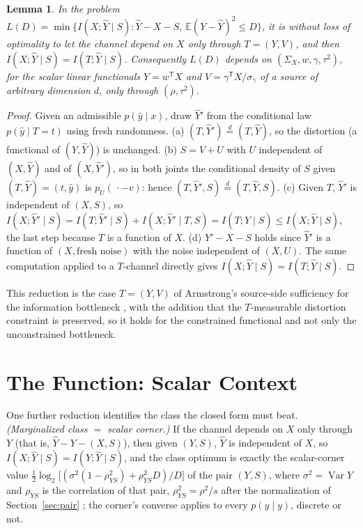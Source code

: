 \documentclass[11pt,onecolumn]{IEEEtran}
\newtheorem{lemma}[theorem]{Lemma}
\newcommand{\E}{\mathbb{E}}
\newcommand{\hY}{\widehat{Y}}
\begin{document}
\begin{lemma}\label{thm:pair}
In the problem
$L(D)=\min\{I(X;\hY\mid S):\hY-X-S,\ \E(Y-\hY)^2\le D\}$, it is without
loss of optimality to let the channel depend on $X$ only through
$T=(Y,V)$, and then $I(X;\hY\mid S)=I(T;\hY\mid S)$. Consequently $L(D)$
depends on $(\Sigma_X,w,\gamma,\tau^2)$, for the scalar linear functionals
$Y=w^{\mathsf T}X$ and $V=\gamma^{\mathsf T}X/\sigma_\gamma$ of a source of
arbitrary dimension $d$, only through $(\rho,\tau^2)$.
\end{lemma}
\begin{proof}
Given an admissible $p(\hat y\mid x)$, draw $\hY'$ from the conditional
law $p(\hat y\mid T=t)$ using fresh randomness. (a) $(T,\hY')\overset{d}=
(T,\hY)$, so the distortion (a functional of $(Y,\hY)$) is unchanged.
(b) $S=V+U$ with $U$ independent of $(X,\hY)$ and of $(X,\hY')$, so in
both joints the conditional density of $S$ given $(T,\hY)=(t,\hat y)$
is $p_U(\,\cdot-v)$: hence
$(T,\hY',S)\overset{d}=(T,\hY,S)$. (c) Given $T$, $\hY'$ is independent
of $(X,S)$, so $I(X;\hY'\mid S)=I(T;\hY'\mid S)+I(X;\hY'\mid T,S)
=I(T;\hY\mid S)\le I(X;\hY\mid S)$, the last step because $T$ is a
function of $X$. (d) $\hY'-X-S$ holds since $\hY'$ is a function of
$(X,\text{fresh noise})$ with the noise independent of $(X,U)$. The same
computation applied to a $T$-channel directly gives
$I(X;\hY\mid S)=I(T;\hY\mid S)$.
\end{proof}

This reduction is the case $T=(Y,V)$ of Armstrong's source-side
sufficiency for the information bottleneck \cite{armstrong2026}, with
the addition that the $T$-measurable distortion constraint is preserved,
so it holds for the constrained functional and not only the
unconstrained bottleneck.

\section{The Function: Scalar Context}
\label{sec:function}

One further reduction identifies the class the closed form must beat.
\emph{(Marginalized class $=$ scalar corner.)} If the channel depends on $X$
only through $Y$ (that is, $\hY-Y-(X,S)$), then given $(Y,S)$, $\hY$ is
independent of $X$, so $I(X;\hY\mid S)=I(Y;\hY\mid S)$, and the class
optimum is exactly the scalar-corner value
$\tfrac12\log_2\bigl[(\sigma^2(1-\rho_{YS}^2)+\rho_{YS}^2D)/D\bigr]$ of the
pair $(Y,S)$, where $\sigma^2=\operatorname{Var}Y$ and $\rho_{YS}$ is the
correlation of that pair, $\rho_{YS}^2=\rho^2/s$ after the normalization
of Section~\ref{sec:pair} \cite{steinberg2009}; the
corner's converse applies to every $p(\hat y\mid y)$, discrete or not.
\end{document}

